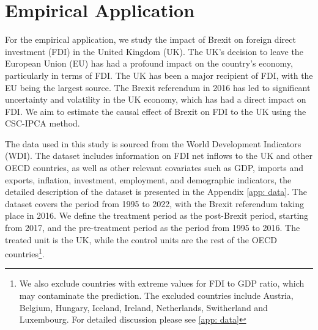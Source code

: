 \documentclass[12pt]{article}
\begin{document}
\section{Empirical Application}
\label{sec: application}
For the empirical application, we study the impact of Brexit on foreign direct investment (FDI) in the United Kingdom (UK). The UK's decision to leave the European Union (EU) has had a profound impact on the country's economy, particularly in terms of FDI. The UK has been a major recipient of FDI, with the EU being the largest source. The Brexit referendum in 2016 has led to significant uncertainty and volatility in the UK economy, which has had a direct impact on FDI. We aim to estimate the causal effect of Brexit on FDI to the UK using the CSC-IPCA method.

The data used in this study is sourced from the World Development Indicators (WDI). The dataset includes information on FDI net inflows to the UK and other OECD countries, as well as other relevant covariates such as GDP, imports and exports, inflation, investment, employment, and demographic indicators, the detailed description of the dataset is presented in the Appendix \ref{app: data}. The dataset covers the period from 1995 to 2022, with the Brexit referendum taking place in 2016. We define the treatment period as the post-Brexit period, starting from 2017, and the pre-treatment period as the period from 1995 to 2016. The treated unit is the UK, while the control units are the rest of the OECD countries\footnote{We also exclude countries with extreme values for FDI to GDP ratio, which may contaminate the prediction. The excluded countries include  Austria, Belgium, Hungary, Iceland, Ireland, Netherlands, Switherland and Luxembourg. For detailed discussion please see \ref{app: data}}.
\end{document}
